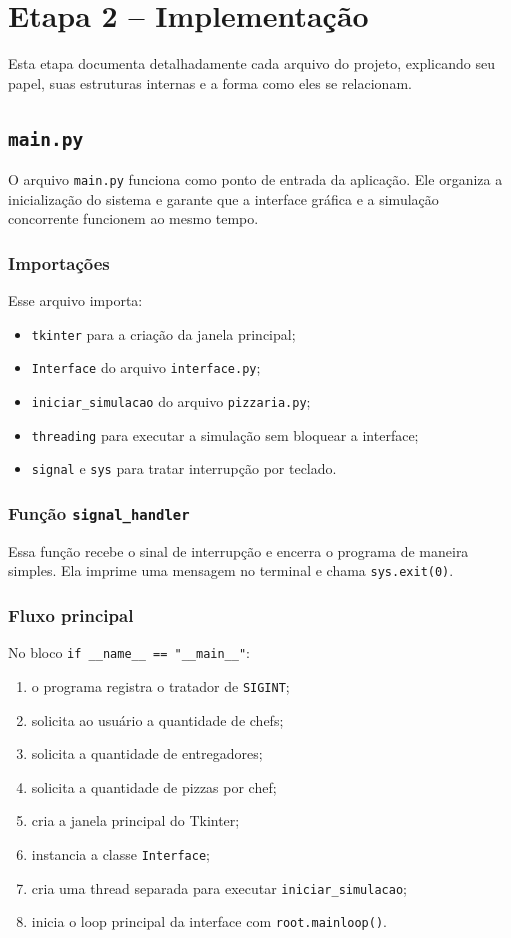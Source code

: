 \documentclass[12pt,a4paper]{article}
\begin{document}
\section{Etapa 2 -- Implementa\c{c}\~ao}
Esta etapa documenta detalhadamente cada arquivo do projeto, explicando seu papel, suas estruturas internas e a forma como eles se relacionam.

\subsection{\texttt{main.py}}
O arquivo \texttt{main.py} funciona como ponto de entrada da aplica\c{c}\~ao. Ele organiza a inicializa\c{c}\~ao do sistema e garante que a interface gr\'afica e a simula\c{c}\~ao concorrente funcionem ao mesmo tempo.

\subsubsection{Importa\c{c}\~oes}
Esse arquivo importa:
\begin{itemize}
    \item \texttt{tkinter} para a cria\c{c}\~ao da janela principal;
    \item \texttt{Interface} do arquivo \texttt{interface.py};
    \item \texttt{iniciar\_simulacao} do arquivo \texttt{pizzaria.py};
    \item \texttt{threading} para executar a simula\c{c}\~ao sem bloquear a interface;
    \item \texttt{signal} e \texttt{sys} para tratar interrup\c{c}\~ao por teclado.
\end{itemize}

\subsubsection{Fun\c{c}\~ao \texttt{signal\_handler}}
Essa fun\c{c}\~ao recebe o sinal de interrup\c{c}\~ao e encerra o programa de maneira simples. Ela imprime uma mensagem no terminal e chama \texttt{sys.exit(0)}.

\subsubsection{Fluxo principal}
No bloco \texttt{if \_\_name\_\_ == "\_\_main\_\_"}:
\begin{enumerate}
    \item o programa registra o tratador de \texttt{SIGINT};
    \item solicita ao usu\'ario a quantidade de chefs;
    \item solicita a quantidade de entregadores;
    \item solicita a quantidade de pizzas por chef;
    \item cria a janela principal do Tkinter;
    \item instancia a classe \texttt{Interface};
    \item cria uma thread separada para executar \texttt{iniciar\_simulacao};
    \item inicia o loop principal da interface com \texttt{root.mainloop()}.
\end{enumerate}
\end{document}
